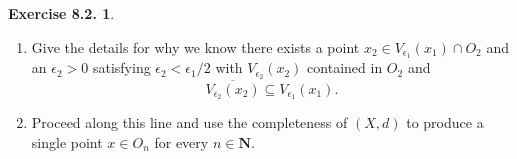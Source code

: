 \documentclass[12pt]{article}
\theoremstyle{definition}
\theoremstyle{exercise}
\newtheorem{exercise}{Exercise 8.2.}
\theoremstyle{solution}
\newcommand{\N}{\mathbf{N}}
\begin{document}
\begin{exercise}
\label{ex:14}
    \begin{enumerate}
        \item Give the details for why we know there exists a point \( x_2 \in V_{\epsilon_1}(x_1) \cap O_2 \) and an \( \epsilon_2 > 0 \) satisfying \( \epsilon_2 < \epsilon_1/2 \) with \( V_{\epsilon_2}(x_2) \) contained in \( O_2 \) and
        \[
            \overline{V_{\epsilon_2}(x_2)} \subseteq V_{\epsilon_1}(x_1).
        \]
        
        \item Proceed along this line and use the completeness of \( (X, d) \) to produce a single point \( x \in O_n \) for every \( n \in \N \).
    \end{enumerate}
\end{exercise}
\end{document}
